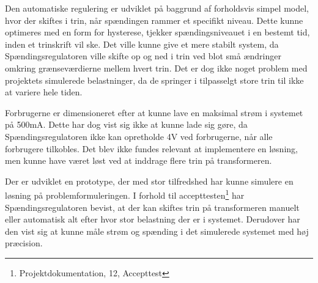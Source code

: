 
Den automatiske regulering er udviklet på baggrund af forholdsvis simpel model, hvor der skiftes i trin, når spændingen rammer et specifikt niveau. Dette kunne optimeres med en form for hysterese, tjekker spændingsniveauet i en bestemt tid, inden et trinskrift vil ske. Det ville kunne give et mere stabilt system, da Spændingsregulatoren ville skifte op og ned i trin ved blot små ændringer omkring grænseværdierne mellem hvert trin. Det er dog ikke noget problem med projektets simulerede belastninger, da de springer i tilpasselgt store trin til ikke at variere hele tiden.

Forbrugerne er dimensioneret efter at kunne lave en maksimal strøm i systemet på 500mA. Dette har dog vist sig ikke at kunne lade sig gøre, da Spændingsregulatoren ikke kan opretholde 4V ved forbrugerne, når alle forbrugere tilkobles. Det blev ikke fundes relevant at implementere en løsning, men kunne have været løst ved at inddrage flere trin på transformeren.

Der er udviklet en prototype, der med stor tilfredshed har kunne simulere en løsning på problemformuleringen. I forhold til accepttesten\footnote{Projektdokumentation, 12, Accepttest} har Spændingsregulatoren bevist, at der kan skiftes trin på transformeren manuelt eller automatisk alt efter hvor stor belastning der er i systemet. Derudover har den vist sig at kunne måle strøm og spænding i det simulerede systemet med høj præcision.